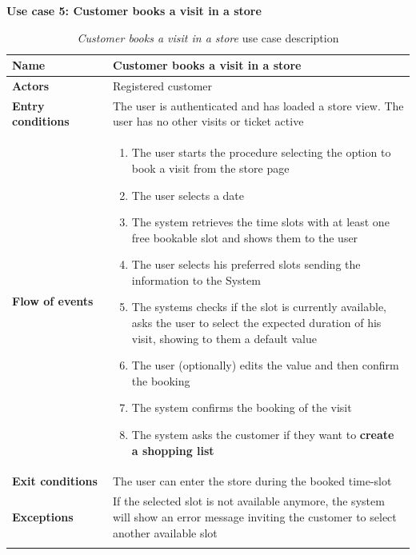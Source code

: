 \clearpage
\textbf{Use case 5: Customer books a visit in a store}
\smallskip
{}
\begin{longtable}{p{0.25\linewidth}p{0.75\linewidth}}
    \toprule
    \textbf{Name}             & \textbf{Customer books a visit in a store}                                                                                  \\
    \midrule
    \textbf{Actors}           & Registered customer                                                                                                         \\
    \midrule
    \textbf{Entry conditions} & The user is authenticated and has loaded a store view. The user has no other visits or ticket active                        \\
    \midrule
    \textbf{Flow of events}   &
    \begin{enumerate}
        \item The user starts the procedure selecting the option to book a visit from the store page
        \item The user selects a date
        \item The system retrieves the time slots with at least one free bookable slot and shows them to the user
        \item The user selects his preferred slots sending the information to the System
        \item The systems checks if the slot is currently available, asks the user to select the expected duration of his visit, showing to them a default value
        \item The user (optionally) edits the value and then confirm the booking
        \item The system confirms the booking of the visit
        \item The system asks the customer if they want to \textbf{create a shopping list}
    \end{enumerate}                                                                                                                              \\
    \midrule
    \textbf{Exit conditions}  & The user can enter the store during the booked time-slot                                                                  \\
    \midrule
    \textbf{Exceptions}       & If the selected slot is not available anymore, the system will show an error message inviting the customer to select another available slot \\
    \bottomrule
    \caption{\emph{Customer books a visit in a store} use case description}
\end{longtable}

